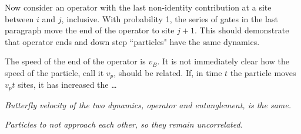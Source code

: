 Now consider an operator with the last non-identity contribution at a site between $i$ and $j$, inclusive. With probability 1, the series of gates in the last paragraph move the end of the operator to site $j+1$. This should demonstrate that operator ends and down step ``particles" have the same dynamics. 

The speed of the end of the operator is $v_B$. It is not immediately clear how the speed of the particle, call it $v_p$, should be related. If, in time $t$ the particle moves $v_pt$ sites, it has increased the \dots

\emph{Butterfly velocity of the two dynamics, operator and entanglement, is the same.}

\emph{Particles to not approach each other, so they remain uncorrelated.}